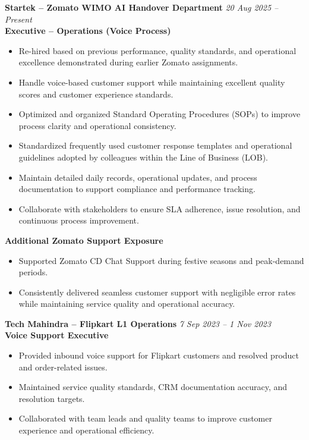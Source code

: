 \documentclass[11pt,a4paper]{article}
\begin{document}
\textbf{Startek – Zomato WIMO AI Handover Department} \hfill \textit{20 Aug 2025 -- Present}\\
\textbf{Executive – Operations (Voice Process)}
\begin{itemize}[leftmargin=*]
\item Re-hired based on previous performance, quality standards, and operational excellence demonstrated during earlier Zomato assignments.
\item Handle voice-based customer support while maintaining excellent quality scores and customer experience standards.
\item Optimized and organized Standard Operating Procedures (SOPs) to improve process clarity and operational consistency.
\item Standardized frequently used customer response templates and operational guidelines adopted by colleagues within the Line of Business (LOB).
\item Maintain detailed daily records, operational updates, and process documentation to support compliance and performance tracking.
\item Collaborate with stakeholders to ensure SLA adherence, issue resolution, and continuous process improvement.
\end{itemize}

\textbf{Additional Zomato Support Exposure}
\begin{itemize}[leftmargin=*]
\item Supported Zomato CD Chat Support during festive seasons and peak-demand periods.
\item Consistently delivered seamless customer support with negligible error rates while maintaining service quality and operational accuracy.
\end{itemize}

\textbf{Tech Mahindra – Flipkart L1 Operations} \hfill \textit{7 Sep 2023 -- 1 Nov 2023}\\
\textbf{Voice Support Executive}
\begin{itemize}[leftmargin=*]
\item Provided inbound voice support for Flipkart customers and resolved product and order-related issues.
\item Maintained service quality standards, CRM documentation accuracy, and resolution targets.
\item Collaborated with team leads and quality teams to improve customer experience and operational efficiency.
\end{itemize}
\end{document}
